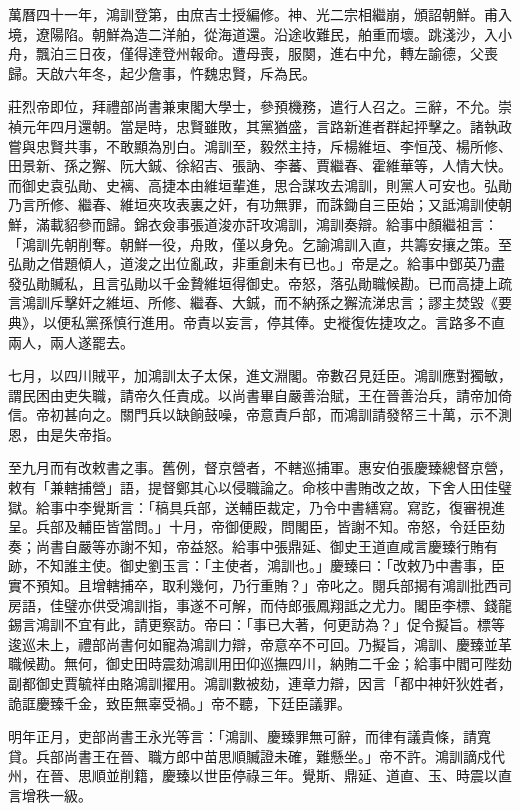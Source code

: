 \begin{pinyinscope}
萬曆四十一年，鴻訓登第，由庶吉士授編修。神、光二宗相繼崩，頒詔朝鮮。甫入境，遼陽陷。朝鮮為造二洋舶，從海道還。沿途收難民，舶重而壞。跳淺沙，入小舟，飄泊三日夜，僅得達登州報命。遭母喪，服闋，進右中允，轉左諭德，父喪歸。天啟六年冬，起少詹事，忤魏忠賢，斥為民。

莊烈帝即位，拜禮部尚書兼東閣大學士，參預機務，遣行人召之。三辭，不允。崇禎元年四月還朝。當是時，忠賢雖敗，其黨猶盛，言路新進者群起抨擊之。諸執政嘗與忠賢共事，不敢顯為別白。鴻訓至，毅然主持，斥楊維垣、李恒茂、楊所修、田景新、孫之獬、阮大鋮、徐紹吉、張訥、李蕃、賈繼春、霍維華等，人情大快。而御史袁弘勛、史褵、高捷本由維垣輩進，思合謀攻去鴻訓，則黨人可安也。弘勛乃言所修、繼春、維垣夾攻表裏之奸，有功無罪，而誅鋤自三臣始；又詆鴻訓使朝鮮，滿載貂參而歸。錦衣僉事張道浚亦訐攻鴻訓，鴻訓奏辯。給事中顏繼祖言：「鴻訓先朝削奪。朝鮮一役，舟敗，僅以身免。乞諭鴻訓入直，共籌安攘之策。至弘勛之借題傾人，道浚之出位亂政，非重創未有已也。」帝是之。給事中鄧英乃盡發弘勛贓私，且言弘勛以千金贄維垣得御史。帝怒，落弘勛職候勘。已而高捷上疏言鴻訓斥擊奸之維垣、所修、繼春、大鋮，而不納孫之獬流涕忠言；謬主焚毀《要典》，以便私黨孫慎行進用。帝責以妄言，停其俸。史褷復佐捷攻之。言路多不直兩人，兩人遂罷去。

七月，以四川賊平，加鴻訓太子太保，進文淵閣。帝數召見廷臣。鴻訓應對獨敏，謂民困由吏失職，請帝久任責成。以尚書畢自嚴善治賦，王在晉善治兵，請帝加倚信。帝初甚向之。關門兵以缺餉鼓噪，帝意責戶部，而鴻訓請發帑三十萬，示不測恩，由是失帝指。

至九月而有改敕書之事。舊例，督京營者，不轄巡捕軍。惠安伯張慶臻總督京營，敕有「兼轄捕營」語，提督鄭其心以侵職論之。命核中書賄改之故，下舍人田佳璧獄。給事中李覺斯言：「稿具兵部，送輔臣裁定，乃令中書繕寫。寫訖，復審視進呈。兵部及輔臣皆當問。」十月，帝御便殿，問閣臣，皆謝不知。帝怒，令廷臣劾奏；尚書自嚴等亦謝不知，帝益怒。給事中張鼎延、御史王道直咸言慶臻行賄有跡，不知誰主使。御史劉玉言：「主使者，鴻訓也。」慶臻曰：「改敕乃中書事，臣實不預知。且增轄捕卒，取利幾何，乃行重賄？」帝叱之。閱兵部揭有鴻訓批西司房語，佳璧亦供受鴻訓指，事遂不可解，而侍郎張鳳翔詆之尤力。閣臣李標、錢龍錫言鴻訓不宜有此，請更察訪。帝曰：「事已大著，何更訪為？」促令擬旨。標等逡巡未上，禮部尚書何如寵為鴻訓力辯，帝意卒不可回。乃擬旨，鴻訓、慶臻並革職候勘。無何，御史田時震劾鴻訓用田仰巡撫四川，納賄二千金；給事中閻可陛劾副都御史賈毓祥由賂鴻訓擢用。鴻訓數被劾，連章力辯，因言「都中神奸狄姓者，詭誆慶臻千金，致臣無辜受禍。」帝不聽，下廷臣議罪。

明年正月，吏部尚書王永光等言：「鴻訓、慶臻罪無可辭，而律有議貴條，請寬貸。兵部尚書王在晉、職方郎中苗思順贓證未確，難懸坐。」帝不許。鴻訓謫戍代州，在晉、思順並削籍，慶臻以世臣停祿三年。覺斯、鼎延、道直、玉、時震以直言增秩一級。


\end{pinyinscope}
